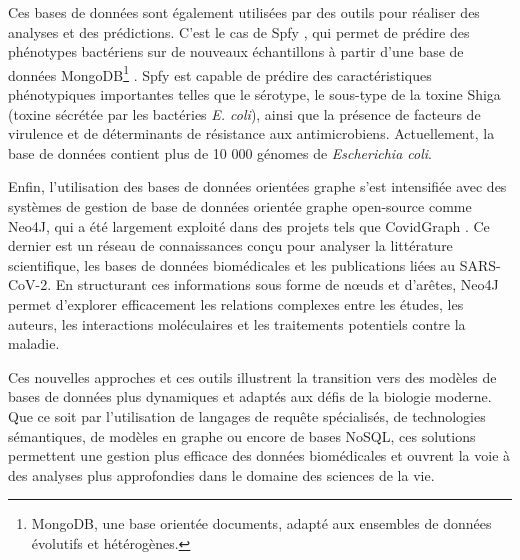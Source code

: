 Ces bases de données sont également utilisées par des outils pour réaliser des analyses et des prédictions. C'est le cas de Spfy \cite{le_spfy_2018}, qui permet de prédire des phénotypes bactériens sur de nouveaux échantillons à partir d'une base de données MongoDB\footnote{MongoDB, une base orientée documents, adapté aux ensembles de données évolutifs et hétérogènes.} \cite{guo_mongodbs_2017}. Spfy est capable de prédire des caractéristiques phénotypiques importantes telles que le sérotype, le sous-type de la toxine Shiga (toxine sécrétée par les bactéries \textit{E. coli}), ainsi que la présence de facteurs de virulence et de déterminants de résistance aux antimicrobiens. Actuellement, la base de données contient plus de 10 000 génomes de \textit{Escherichia coli}.

Enfin, l’utilisation des bases de données orientées graphe s’est intensifiée avec des systèmes de gestion de base de données orientée graphe open-source comme Neo4J, qui a été largement exploité dans des projets tels que CovidGraph \cite{gutebier_covidgraph_2022}. Ce dernier est un réseau de connaissances conçu pour analyser la littérature scientifique, les bases de données biomédicales et les publications liées au SARS-CoV-2. En structurant ces informations sous forme de n\oe uds et d’arêtes, Neo4J permet d’explorer efficacement les relations complexes entre les études, les auteurs, les interactions moléculaires et les traitements potentiels contre la maladie.

Ces nouvelles approches et ces outils illustrent la transition vers des modèles de bases de données plus dynamiques et adaptés aux défis de la biologie moderne. Que ce soit par l’utilisation de langages de requête spécialisés, de technologies sémantiques, de modèles en graphe ou encore de bases NoSQL, ces solutions permettent une gestion plus efficace des données biomédicales et ouvrent la voie à des analyses plus approfondies dans le domaine des sciences de la vie.
